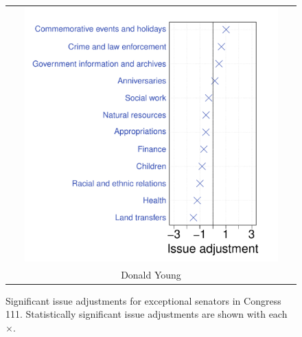 \begin{figure}
\begin{tabular}{c}
      \includegraphics[width=0.9\textwidth,height=0.7\textwidth]{chapter_spatial_voting_with_text/figures/3393_house_Donald_Young_400440.pdf} \\ \Large Donald Young \\
    \end{tabular}
  \vspace{-5pt}
  \caption{Significant issue adjustments for exceptional senators in
  Congress 111.  Statistically significant issue adjustments are shown with each $\times$.}
  \label{figure:significant_offsets}
  \vspace{-5pt}
\end{figure}


